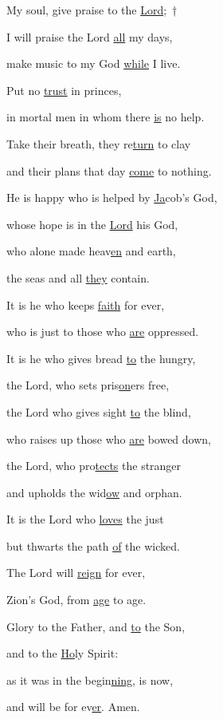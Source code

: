 \noindent My soul, give praise to the \uline{Lord};~†~\nopagebreak

I will praise the Lord \uline{all} my days,~\GreStar{}~\nopagebreak

make music to my God \uline{while} I live.

\noindent Put no \uline{trust} in princes,~\GreStar{}~\nopagebreak

in mortal men in whom there \uline{is} no help.

\noindent Take their breath, they re\uline{turn} to clay~\GreStar{}~\nopagebreak

and their plans that day \uline{come} to nothing.

\noindent He is happy who is helped by \uline{Ja}cob’s God,~\GreStar{}~\nopagebreak

whose hope is in the \uline{Lord} his God,

\noindent who alone made heav\uline{en} and earth,~\GreStar{}~\nopagebreak

the seas and all \uline{they} contain.

\noindent It is he who keeps \uline{faith} for ever,~\GreStar{}~\nopagebreak

who is just to those who \uline{are} oppressed.

\noindent It is he who gives bread \uline{to} the hungry,~\GreStar{}~\nopagebreak

the Lord, who sets pris\uline{on}ers free,

\noindent the Lord who gives sight \uline{to} the blind,~\GreStar{}~\nopagebreak

who raises up those who \uline{are} bowed down,

\noindent the Lord, who pro\uline{tects} the stranger~\GreStar{}~\nopagebreak

and upholds the wid\uline{ow} and orphan.

\noindent It is the Lord who \uline{loves} the just~\GreStar{}~\nopagebreak

but thwarts the path \uline{of} the wicked.

\noindent The Lord will \uline{reign} for ever,~\GreStar{}~\nopagebreak

Zion’s God, from \uline{age} to age.

\noindent Glory to the Father, and \uline{to} the Son,~\GreStar{}~\nopagebreak

and to the \uline{Ho}ly Spirit:

\noindent as it was in the begin\uline{ning}, is now,~\GreStar{}~\nopagebreak

and will be for ev\uline{er}. Amen.

